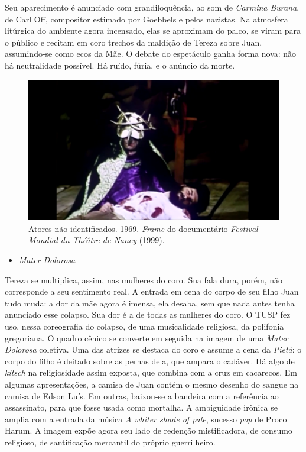 Seu aparecimento é anunciado com grandiloquência, ao som de \textit{Carmina
Burana}, de Carl Off, compositor estimado por Goebbels e pelos nazistas.
Na atmosfera litúrgica do ambiente agora incensado, elas se aproximam do
palco, se viram para o público e recitam em coro trechos da maldição de
Tereza sobre Juan, assumindo-se como ecos da Mãe. O debate do espetáculo
ganha forma nova: não há neutralidade possível. Há ruído, fúria, e o
anúncio da morte.

\begin{figure}
\includegraphics[width=\columnwidth]{./media/IMAGEM53.png}
\caption{Atores não identificados. 1969. \textit{Frame} do documentário
\textit{Festival Mondial du Théâtre de Nancy} (1999).}
\end{figure}

\begin{itemize}
\item
  \textit{Mater Dolorosa}
\end{itemize}

Tereza se multiplica, assim, nas mulheres do coro. Sua fala dura, porém,
não corresponde a seu sentimento real. A entrada em cena do corpo de seu
filho Juan tudo muda: a dor da mãe agora é imensa, ela desaba, sem que
nada antes tenha anunciado esse colapso. Sua dor é a de todas as
mulheres do coro. O TUSP fez uso, nessa coreografia do colapso, de uma
musicalidade religiosa, da polifonia gregoriana. O quadro cênico se
converte em seguida na imagem de uma \textit{Mater Dolorosa} coletiva. Uma
das atrizes se destaca do coro e assume a cena da \textit{Pietà}: o corpo
do filho é deitado sobre as pernas dela, que ampara o cadáver. Há algo
de \textit{kitsch} na religiosidade assim exposta, que combina com a cruz
em cacarecos. Em algumas apresentações, a camisa de Juan contém o mesmo
desenho do sangue na camisa de Edson Luís. Em outras, baixou-se a
bandeira com a referência ao assassinato, para que fosse usada como
mortalha. A ambiguidade irônica se amplia com a entrada da música \textit{A
whiter shade of pale}, sucesso \textit{pop} de Procol Harum. A imagem expõe
agora seu lado de redenção mistificadora, de consumo religioso, de
santificação mercantil do próprio guerrilheiro.

